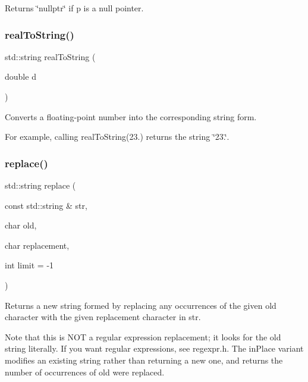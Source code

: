 Returns \char`\"{}nullptr\char`\"{} if p is a null pointer. \mbox{\label{namespacesgl_1_1priv_1_1strlib_af1835c719cd027ed09ca12e7b700c7d7}} 
\subsubsection{\texorpdfstring{real\+To\+String()}{realToString()}}
{\footnotesize\ttfamily std\+::string real\+To\+String (\begin{DoxyParamCaption}\item[{double}]{d }\end{DoxyParamCaption})}



Converts a floating-\/point number into the corresponding string form. 

For example, calling {\ttfamily real\+To\+String(23.)} returns the string {\ttfamily \char`\"{}23.\char`\"{}}. \mbox{\label{namespacesgl_1_1priv_1_1strlib_a9ee83dec7fbd7c18bc68ee91502ed839}} 
\subsubsection{\texorpdfstring{replace()}{replace()}\hspace{0.1cm}{\footnotesize\ttfamily [1/2]}}
{\footnotesize\ttfamily std\+::string replace (\begin{DoxyParamCaption}\item[{const std\+::string \&}]{str,  }\item[{char}]{old,  }\item[{char}]{replacement,  }\item[{int}]{limit = {\ttfamily -\/1} }\end{DoxyParamCaption})}



Returns a new string formed by replacing any occurrences of the given \textquotesingle{}old\textquotesingle{} character with the given replacement character in \textquotesingle{}str\textquotesingle{}. 

Note that this is N\+OT a regular expression replacement; it looks for the \textquotesingle{}old\textquotesingle{} string literally. If you want regular expressions, see regexpr.\+h. The \textquotesingle{}in\+Place\textquotesingle{} variant modifies an existing string rather than returning a new one, and returns the number of occurrences of \textquotesingle{}old\textquotesingle{} were replaced. \mbox{\label{namespacesgl_1_1priv_1_1strlib_a378825875fe99bccd7d7aa8f971d2ea3}} 
